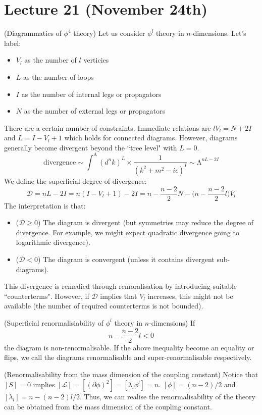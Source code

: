 \section{Lecture 21 (November 24th)}
\begin{defi}
(Diagrammatics of $\phi ^{4}$ theory) Let us consider $\phi ^{l}$ theory in $n$-dimensions. Let's label:
\begin{itemize}
\item[(i)] $V_{l}$ as the number of $l$ verticies
\item[(ii)] $L$ as the number of loops
\item[(iii)] $I$ as the number of internal legs or propagators
\item[(iv)] $N$ as the number of external legs or propagators
\end{itemize}
There are a certain number of constraints. Immediate relations are $lV_{l}=N+2I$ and $L=I-V_{l}+1$ which holds for connected diagrams. However, diagrams generally become divergent beyond the ``tree level" with $L=0$.
\[\mathrm{divergence}\sim \int^{\mathrm{\Lambda }} (d^{n}k)^{L}\times \dfrac{1}{(k^2+m^2-i\epsilon )^{I}}\sim \mathrm{\Lambda }^{nL-2I}\]
We define the superficial degree of divergence:
\[\mathcal{D}=nL-2I=n(I-V_{l}+1)-2I=n-\dfrac{n-2}{2}N-\Big(n-\dfrac{n-2}{2}l\Big)V_{l}\]
The interpretation is that:
\begin{itemize}
\item[(i)] ($\mathcal{D}\geq 0$) The diagram is divergent (but symmetries may reduce the degree of divergence. For example, we might expect quadratic divergence going to logarithmic divergence).
\item[(ii)] ($\mathcal{D}<0$) The diagram is convergent (unless it contains divergent sub-diagrams).
\end{itemize}
This divergence is remedied through remoralisation by introducing suitable ``counterterms". However, if $\mathcal{D}$ implies that $V_{l}$ increases, this might not be available (the number of required counterterms is not bounded).
\end{defi}
\vspace{2ex}
\begin{rmk}
(Superficial renormalisiability of $\phi ^{l}$ theory in $n$-dimensions) If
\[n-\dfrac{n-2}{2}l<0\]
the diagram is non-renormalisable. If the above inequality become an equality or flips, we call the diagrams renormalisable and super-renormalisable respectively.
\end{rmk}
\vspace{2ex}
\begin{rmk}
(Renormalisability from the mass dimension of the coupling constant) Notice that $[S]=0$ implies $[\mathcal{L}]=[(\partial \phi )^2]=[\lambda _{l}\phi ^{l}]=n$. $[\phi ]=(n-2)/2$ and $[\lambda _{l}]=n-(n-2)l/2$. Thus, we can realise the renormalisability of the theory can be obtained from the mass dimension of the coupling constant.
\end{rmk}
